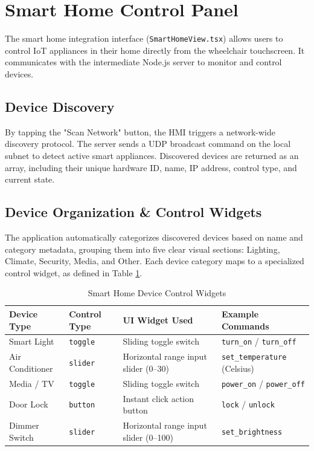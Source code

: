 \section{Smart Home Control Panel}
The smart home integration interface (\texttt{SmartHomeView.tsx}) allows users to control IoT appliances in their home directly from the wheelchair touchscreen. It communicates with the intermediate Node.js server to monitor and control devices.

\subsection{Device Discovery}
By tapping the "Scan Network" button, the HMI triggers a network-wide discovery protocol. The server sends a UDP broadcast command on the local subnet to detect active smart appliances. Discovered devices are returned as an array, including their unique hardware ID, name, IP address, control type, and current state.

\subsection{Device Organization \& Control Widgets}
The application automatically categorizes discovered devices based on name and category metadata, grouping them into five clear visual sections: Lighting, Climate, Security, Media, and Other.
Each device category maps to a specialized control widget, as defined in Table \ref{tab:smart-home-controls}.

\begin{table}[H]
\centering
\caption{Smart Home Device Control Widgets}
\label{tab:smart-home-controls}
\begin{tabularx}{\textwidth}{|l|l|>{\raggedright\arraybackslash}X|l|}
\hline
\textbf{Device Type} & \textbf{Control Type} & \textbf{UI Widget Used} & \textbf{Example Commands} \\ \hline
Smart Light & \texttt{toggle} & Sliding toggle switch & \texttt{turn\_on} / \texttt{turn\_off} \\ \hline
Air Conditioner & \texttt{slider} & Horizontal range input slider (0--30) & \texttt{set\_temperature} (Celsius) \\ \hline
Media / TV & \texttt{toggle} & Sliding toggle switch & \texttt{power\_on} / \texttt{power\_off} \\ \hline
Door Lock & \texttt{button} & Instant click action button & \texttt{lock} / \texttt{unlock} \\ \hline
Dimmer Switch & \texttt{slider} & Horizontal range input slider (0--100) & \texttt{set\_brightness} \\ \hline
\end{tabularx}
\end{table}

